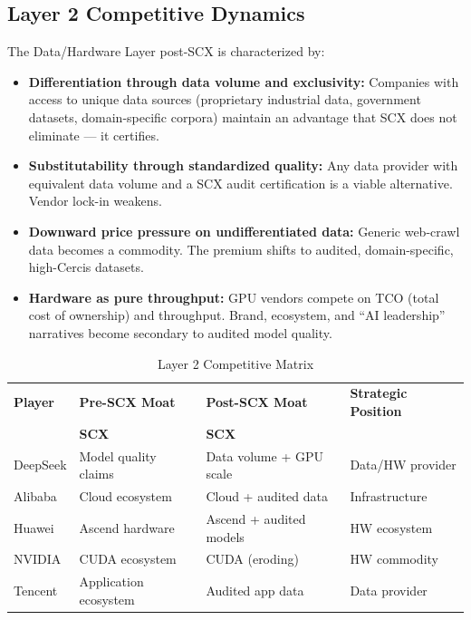 \documentclass[12pt,a4paper]{article}
\theoremstyle{remark}
\begin{document}
\subsection{Layer 2 Competitive Dynamics}
The Data/Hardware Layer post-SCX is characterized by:
\begin{itemize}
 \item \textbf{Differentiation through data volume and exclusivity:} Companies 
 with access to unique data sources (proprietary industrial data, 
 government datasets, domain-specific corpora) maintain an advantage 
 that SCX does not eliminate --- it certifies.
 \item \textbf{Substitutability through standardized quality:} Any data provider 
 with equivalent data volume and a SCX audit certification is a viable 
 alternative. Vendor lock-in weakens.
 \item \textbf{Downward price pressure on undifferentiated data:} Generic web-crawl 
 data becomes a commodity. The premium shifts to audited, domain-specific, 
 high-Cercis datasets.
 \item \textbf{Hardware as pure throughput:} GPU vendors compete on TCO (total cost 
 of ownership) and throughput. Brand, ecosystem, and ``AI leadership'' 
 narratives become secondary to audited model quality.
\end{itemize}
\begin{table}[H]
\centering
\caption{Layer 2 Competitive Matrix}
\begin{tabular}{@{}p{3.5cm}lll@{}}
\toprule
\textbf{Player } & \textbf{Pre-SCX Moat} & \textbf{Post-SCX Moat} & \textbf{Strategic Position} \\
& \textbf{SCX} & \textbf{SCX} &  \\
\midrule
DeepSeek & Model quality claims & Data volume + GPU scale & Data/HW provider \\
 Alibaba & Cloud ecosystem & Cloud + audited data & Infrastructure \\
 Huawei & Ascend hardware & Ascend + audited models & HW ecosystem \\
NVIDIA & CUDA ecosystem & CUDA (eroding) & HW commodity \\
Tencent & Application ecosystem & Audited app data & Data provider \\
\bottomrule
\end{tabular}
\end{table}
\end{document}

